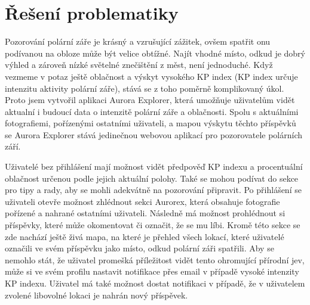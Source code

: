 \section{Řešení problematiky}
\par Pozorování polární záře je krásný a vzrušující zážitek, ovšem spatřit onu podívanou na obloze může být velice obtížné. Najít vhodné místo, odkud je dobrý výhled a zároveň nízké světelné znečištění z měst, není jednoduché. Když vezmeme v potaz ještě oblačnost a výskyt vysokého KP index (KP index určuje intenzitu aktivity polární záře), stává se z toho poměrně komplikovaný úkol. Proto jsem vytvořil aplikaci Aurora Explorer, která umožňuje uživatelům vidět aktualní i budoucí data o intenzitě polární záře a oblačnosti. Spolu s aktuálními fotografiemi, pořízenými ostatními uživateli, a mapou výskytu těchto příspěvků se Aurora Explorer stává jedinečnou webovou aplikací pro pozorovatele polárních září.
\par Uživatelé bez přihlášení mají možnost vidět předpověď KP indexu a  procentuální oblačnost určenou podle jejich aktuální polohy. Také se mohou podívat do sekce pro tipy a rady, aby se mohli adekvátně na pozorování připravit. Po přihlášení se uživateli otevře možnost zhlédnout sekci Aurorex, která obsahuje fotografie pořízené a nahrané ostatními uživateli. Následně má možnost prohlédnout si příspěvky, které může okomentovat či označit, že se mu líbi. Kromě této sekce se zde nachází ještě živá mapa, na které je přehled všech lokací, které uživatelé označili ve svém příspěvku jako místo, odkud polární záři spatřili. Aby se nemohlo stát, že uživatel promešká příležitost vidět tento ohromující přírodní jev, může si ve svém profilu nastavit notifikace přes email v případě vysoké intenzity KP indexu. Uživatel má také možnost dostat notifikaci v případě, že v uživatelem zvolené libovolné lokaci je nahrán nový příspěvek.